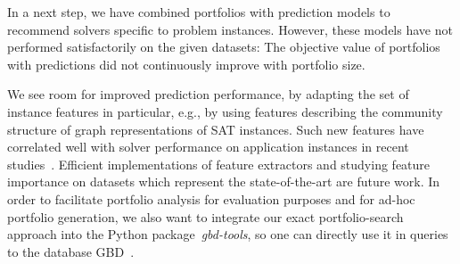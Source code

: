 \documentclass[runningheads]{llncs}
\begin{document}
In a next step, we have combined portfolios with prediction models to recommend solvers specific to problem instances.
However, these models have not performed satisfactorily on the given datasets:
The objective value of portfolios with predictions did not continuously improve with portfolio size.

We see room for improved prediction performance, by adapting the set of instance features in particular,
e.g., by using features describing the community structure of graph representations of SAT instances.
Such new features have correlated well with solver performance on application instances in recent studies~\cite{Ansotegui:2017:StructureFeatures,Li:2021:HCS}. 
Efficient implementations of feature extractors and studying feature importance on datasets which represent the state-of-the-art are future work. 
In order to facilitate portfolio analysis for evaluation purposes and for ad-hoc portfolio generation, we also want to integrate our exact portfolio-search approach into the Python package~\emph{gbd-tools}, so one can directly use it in queries to the database GBD~\cite{iser2020collaborative}. 



\end{document}
